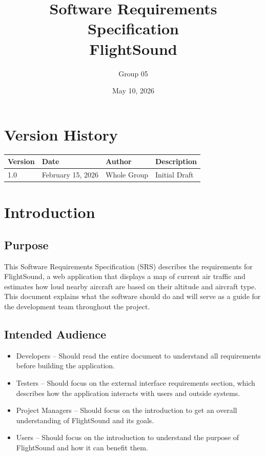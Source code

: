\documentclass[12pt]{article}
\title{Software Requirements Specification\\FlightSound}
\author{Group 05}
\date{May 10, 2026}
\begin{document}
\maketitle
\newpage

\tableofcontents
\newpage

\section*{Version History}

\begin{tabular}{|l|l|l|l|}
\hline
Version & Date & Author & Description \\
\hline
1.0 & February 15, 2026 & Whole Group & Initial Draft \\

\hline
\end{tabular}

\newpage

\section{Introduction}

\subsection{Purpose}
This Software Requirements Specification (SRS) describes the requirements for FlightSound, a web application that displays a map of current air traffic and estimates how loud nearby aircraft are based on their altitude and aircraft type. This document explains what the software should do and will serve as a guide for the development team throughout the project.

\subsection{Intended Audience}
\begin{itemize}
\item Developers -- Should read the entire document to understand all requirements before building the application.
\item Testers -- Should focus on the external interface requirements section, which describes how the application interacts with users and outside systems.
\item Project Managers -- Should focus on the introduction to get an overall understanding of FlightSound and its goals.
\item Users -- Should focus on the introduction to understand the purpose of FlightSound and how it can benefit them.
\end{itemize}
\end{document}
